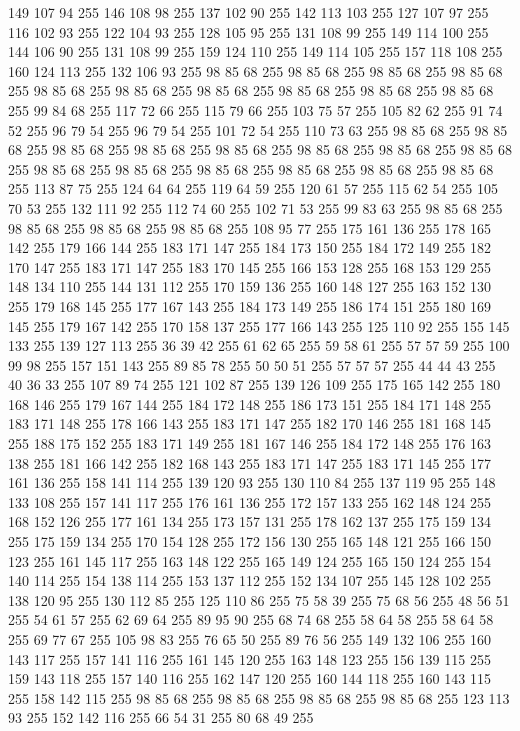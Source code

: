 149 107 94 255 146 108 98 255 137 102 90 255 142 113 103 255 127 107 97 255 116 102 93 255 122 104 93 255 128 105 95 255 131 108 99 255 149 114 100 255 144 106 90 255 131 108 99 255 159 124 110 255 149 114 105 255 157 118 108 255 160 124 113 255 132 106 93 255 98 85 68 255 98 85 68 255 98 85 68 255 98 85 68 255 98 85 68 255 98 85 68 255 98 85 68 255 98 85 68 255 98 85 68 255 98 85 68 255 99 84 68 255 117 72 66 255 115 79 66 255 103 75 57 255 105 82 62 255 91 74 52 255 96 79 54 255 96 79 54 255 101 72 54 255 110 73 63 255 98 85 68 255 98 85 68 255 98 85 68 255 98 85 68 255 98 85 68 255 98 85 68 255 98 85 68 255 98 85 68 255 98 85 68 255 98 85 68 255 98 85 68 255 98 85 68 255 98 85 68 255 98 85 68 255 113 87 75 255 124 64 64 255 119 64 59 255 120 61 57 255 115 62 54 255 105 70 53 255 132 111 92 255 112 74 60 255 102 71 53 255 99 83 63 255 98 85 68 255 98 85 68 255 98 85 68 255
98 85 68 255 108 95 77 255 175 161 136 255 178 165 142 255 179 166 144 255 183 171 147 255 184 173 150 255 184 172 149 255 182 170 147 255 183 171 147 255 183 170 145 255 166 153 128 255 168 153 129 255 148 134 110 255 144 131 112 255 170 159 136 255 160 148 127 255 163 152 130 255 179 168 145 255 177 167 143 255 184 173 149 255 186 174 151 255 180 169 145 255 179 167 142 255 170 158 137 255 177 166 143 255 125 110 92 255 155 145 133 255 139 127 113 255 36 39 42 255 61 62 65 255 59 58 61 255 57 57 59 255 100 99 98 255 157 151 143 255 89 85 78 255 50 50 51 255 57 57 57 255 44 44 43 255 40 36 33 255 107 89 74 255 121 102 87 255 139 126 109 255 175 165 142 255 180 168 146 255 179 167 144 255 184 172 148 255 186 173 151 255 184 171 148 255 183 171 148 255 178 166 143 255 183 171 147 255 182 170 146 255 181 168 145 255 188 175 152 255 183 171 149 255 181 167 146 255 184 172 148 255 176 163 138 255 181 166 142 255 182 168 143 255 183 171 147 255 183 171 145 255 177 161 136 255
158 141 114 255 139 120 93 255 130 110 84 255 137 119 95 255 148 133 108 255 157 141 117 255 176 161 136 255 172 157 133 255 162 148 124 255 168 152 126 255 177 161 134 255 173 157 131 255 178 162 137 255 175 159 134 255 175 159 134 255 170 154 128 255 172 156 130 255 165 148 121 255 166 150 123 255 161 145 117 255 163 148 122 255 165 149 124 255 165 150 124 255 154 140 114 255 154 138 114 255 153 137 112 255 152 134 107 255 145 128 102 255 138 120 95 255 130 112 85 255 125 110 86 255 75 58 39 255 75 68 56 255 48 56 51 255 54 61 57 255 62 69 64 255 89 95 90 255 68 74 68 255 58 64 58 255 58 64 58 255 69 77 67 255 105 98 83 255 76 65 50 255 89 76 56 255 149 132 106 255 160 143 117 255 157 141 116 255 161 145 120 255 163 148 123 255 156 139 115 255 159 143 118 255 157 140 116 255 162 147 120 255 160 144 118 255 160 143 115 255 158 142 115 255 98 85 68 255 98 85 68 255 98 85 68 255 98 85 68 255 123 113 93 255 152 142 116 255 66 54 31 255 80 68 49 255
